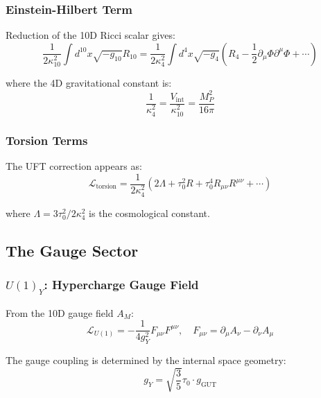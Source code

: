 \subsubsection{Einstein-Hilbert Term}

Reduction of the 10D Ricci scalar gives:
\begin{equation}
    \frac{1}{2\kappa_{10}^2}\int d^{10}x \sqrt{-g_{10}}R_{10} = \frac{1}{2\kappa_4^2}\int d^4x \sqrt{-g_4}\left(R_4 - \frac{1}{2}\partial_\mu\Phi\partial^\mu\Phi + \cdots\right)
\end{equation}

where the 4D gravitational constant is:
\begin{equation}
    \frac{1}{\kappa_4^2} = \frac{V_{\text{int}}}{\kappa_{10}^2} = \frac{M_P^2}{16\pi}
\end{equation}

\subsubsection{Torsion Terms}

The UFT correction appears as:
\begin{equation}
    \mathcal{L}_{\text{torsion}} = \frac{1}{2\kappa_4^2}\left(2\Lambda + \tau_0^2 R + \tau_0^4 R_{\mu\nu}R^{\mu\nu} + \cdots\right)
\end{equation}

where $\Lambda = 3\tau_0^2/2\kappa_4^2$ is the cosmological constant.

\subsection{The Gauge Sector}

\subsubsection{$U(1)_Y$: Hypercharge Gauge Field}

From the 10D gauge field $A_M$:
\begin{equation}
    \mathcal{L}_{U(1)} = -\frac{1}{4g_Y^2}F_{\mu\nu}F^{\mu\nu}, \quad F_{\mu\nu} = \partial_\mu A_\nu - \partial_\nu A_\mu
\end{equation}

The gauge coupling is determined by the internal space geometry:
\begin{equation}
    g_Y = \sqrt{\frac{3}{5}}\tau_0 \cdot g_{\text{GUT}}
\end{equation}

